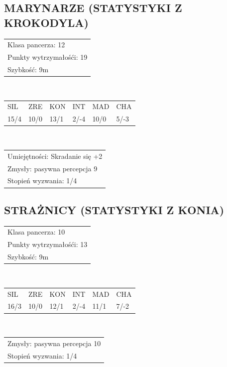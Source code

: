 \documentclass[14pt]{article}
\begin{document}
\subsection*{MARYNARZE (STATYSTYKI Z KROKODYLA)}
\begin{tabularx}{0,75\textwidth}{X}
    \hline
    Klasa pancerza: 12 \\
    Punkty wytrzymałośći: 19 \\
    Szybkość: 9m \\
    \hline
\end{tabularx} \\
\begin{tabularx}{0,75\textwidth}{YYYYYY}
    SIL & ZRE & KON & INT & MAD & CHA \\
    15/4 & 10/0 & 13/1 & 2/-4 & 10/0 & 5/-3 \\
\end{tabularx} \\
\begin{tabularx}{0,75\textwidth}{X}
    \hline
    Umiejętności: Skradanie się +2 \\
    Zmysły: pasywna percepcja 9 \\
    Stopień wyzwania: 1/4 \\
    \hline
\end{tabularx}

\subsection*{STRAŻNICY (STATYSTYKI Z KONIA)}
\begin{tabularx}{0,75\textwidth}{X}
    \hline
    Klasa pancerza: 10 \\
    Punkty wytrzymałośći: 13 \\
    Szybkość: 9m \\
    \hline
\end{tabularx} \\
\begin{tabularx}{0,75\textwidth}{YYYYYY}
    SIL & ZRE & KON & INT & MAD & CHA \\
    16/3 & 10/0 & 12/1 & 2/-4 & 11/1 & 7/-2 \\
\end{tabularx} \\
\begin{tabularx}{0,75\textwidth}{X}
    \hline
    Zmysły: pasywna percepcja 10 \\
    Stopień wyzwania: 1/4 \\
    \hline
\end{tabularx}
\end{document}
